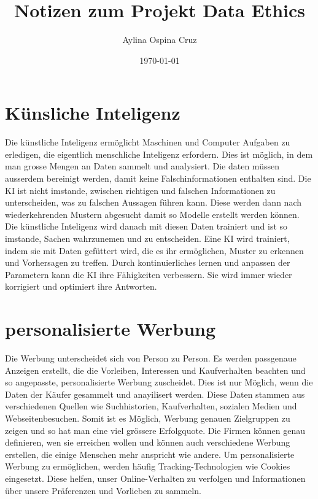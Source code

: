 \documentclass{article}
\title{Notizen zum Projekt Data Ethics}
\author{Aylina Ospina Cruz}
\date{\today}
\begin{document}
\maketitle


\tableofcontents


\section{Künsliche Inteligenz}

Die künstliche Inteligenz ermöglicht Maschinen und Computer Aufgaben zu erledigen, die eigentlich menschliche Inteligenz erfordern. Dies ist möglich, in dem man grosse Mengen an Daten sammelt und analysiert. Die daten müssen ausserdem bereinigt werden, damit keine Falschinformationen enthalten sind. Die KI ist nicht imstande, zwischen richtigen und falschen Informationen zu unterscheiden, was zu falschen Aussagen führen kann. Diese werden dann nach wiederkehrenden Mustern abgesucht damit so Modelle erstellt werden können. Die künstliche Inteligenz wird danach mit diesen Daten trainiert und ist so imstande, Sachen wahrzunemen und zu entscheiden. Eine KI wird trainiert, indem sie mit Daten gefüttert wird, die es ihr ermöglichen, Muster zu erkennen und Vorhersagen zu treffen. Durch kontinuierliches lernen und anpassen der Parametern kann die KI ihre Fähigkeiten verbessern. Sie wird immer wieder korrigiert und optimiert ihre Antworten. 

\section{personalisierte Werbung}
 Die Werbung unterscheidet sich von Person zu Person. Es werden passgenaue Anzeigen erstellt, die die Vorleiben, Interessen und Kaufverhalten beachten und so angepasste, personalisierte Werbung zuscheidet. Dies ist nur Möglich, wenn die Daten der Käufer gesammelt und anayilisert werden. Diese Daten stammen aus verschiedenen Quellen wie Suchhistorien, Kaufverhalten, sozialen Medien und Webseitenbesuchen. Somit ist es Möglich, Werbung genauen Zielgruppen zu zeigen und so hat man eine viel grössere Erfolgquote. Die Firmen können genau definieren, wen sie erreichen wollen und können auch verschiedene Werbung erstellen, die einige Menschen mehr anspricht wie andere. Um personalisierte Werbung zu ermöglichen, werden häufig Tracking-Technologien wie Cookies eingesetzt. Diese helfen, unser Online-Verhalten zu verfolgen und Informationen über unsere Präferenzen und Vorlieben zu sammeln. 
\end{document}
